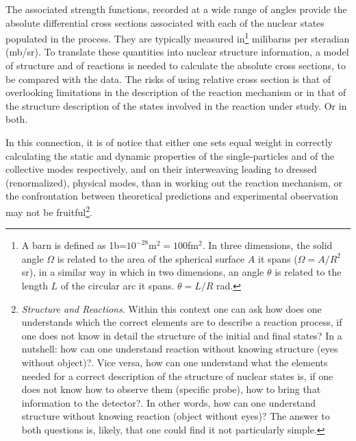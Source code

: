 The associated strength functions, recorded at a wide range of angles provide the absolute differential cross sections associated with each of the nuclear states populated in the process. They are  typically measured in\footnote{A barn is defined as 1b=$10^{-28}$m$^2=100$fm$^2$. In three dimensions, the solid angle $\Omega$ is related to the area of the spherical surface $A$ it spans ($\Omega=A/R^2$ sr), in a similar way in which in two dimensions, an angle $\theta$ is related to the length $L$ of the circular arc it spans. $\theta=L/R$ rad.} milibarns per  steradian (mb/sr). To translate these quantities into nuclear structure information, a model of structure and of reactions is needed to calculate the absolute cross sections, to be compared with the data. The risks of using relative cross section is that of overlooking limitations in the description of the reaction mechanism or in that of the structure description of the states involved in the reaction under study. Or in both.

In this connection, it is of notice that either one sets equal weight in correctly calculating the static and dynamic   properties  of the single-particles and of the collective modes respectively, and on their interweaving leading to dressed (renormalized), physical modes, than in working out the reaction mechanism, or the confrontation between theoretical predictions and experimental observation may not be fruitful\footnote{\textit{Structure and Reactions}. Within this context one can ask how does one understands which the correct elements are to describe a reaction process, if one does not know in detail the structure of the initial and final states? In a nutshell: how can one understand reaction without knowing structure (eyes without object)?. 
Vice versa, how can one understand what the elements needed for a correct description of the structure of nuclear states is, if one does not know how to observe them (specific probe), how to bring that information to the detector?. In other words, how can one understand structure without knowing reaction (object without eyes)? The answer to both questions is, likely, that one could find it not particularly simple.}.

